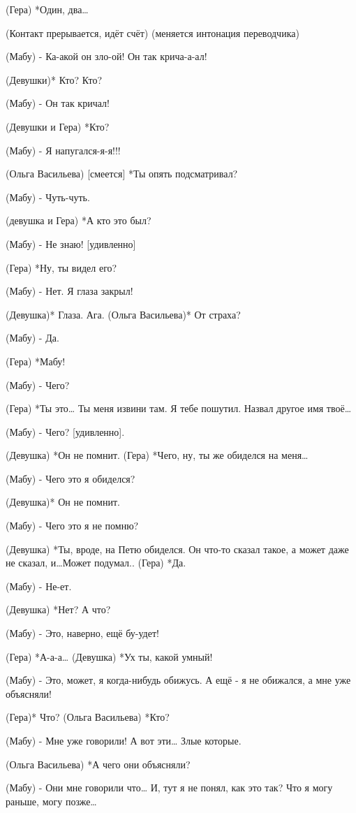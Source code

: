 (Гера) *Один, два…

(Контакт прерывается, идёт счёт)
(меняется интонация переводчика)

(Мабу) - Ка-акой он зло-ой! Он так крича-а-ал!

(Девушки)* Кто? Кто?

(Мабу) - Он так кричал!

(Девушки и Гера) *Кто?

(Мабу) - Я напугался-я-я!!! 

(Ольга Васильева) [смеется] *Ты опять подсматривал?

(Мабу) - Чуть-чуть.

(девушка и Гера) *А кто это был?

(Мабу) - Не знаю! [удивленно] 

(Гера) *Ну, ты видел его? 

(Мабу) - Нет. Я глаза закрыл!

(Девушка)* Глаза. Ага.
(Ольга Васильева)* От страха?

(Мабу) - Да.

(Гера) *Мабу!

(Мабу) - Чего? 

(Гера) *Ты это… Ты меня извини там. Я тебе пошутил. Назвал другое имя твоё… 

(Мабу) - Чего? [удивленно].

(Девушка) *Он не помнит.
(Гера) *Чего, ну, ты же обиделся на меня… 

(Мабу) - Чего это я обиделся?

(Девушка)* Он не помнит.

(Мабу) - Чего это я не помню?

(Девушка) *Ты, вроде, на Петю обиделся. Он что-то сказал такое, а может даже не сказал, и…Может подумал..
(Гера) *Да.

(Мабу) - Не-ет.

(Девушка) *Нет? А что?

(Мабу) - Это, наверно, ещё бу-удет!

(Гера) *А-а-а…
(Девушка) *Ух ты, какой умный!

(Мабу)  - Это, может, я когда-нибудь обижусь. А ещё - я не обижался, а мне уже объясняли!

(Гера)* Что?
(Ольга Васильева) *Кто?

(Мабу) - Мне уже говорили! А вот эти… Злые которые.

(Ольга Васильева) *А чего они объясняли?

(Мабу) - Они мне говорили что… И, тут я не понял, как это так?  Что я могу раньше, могу позже… 

